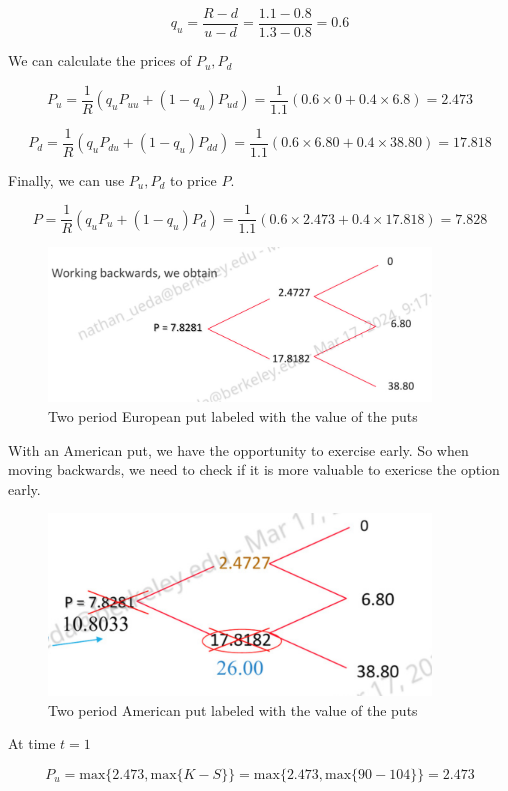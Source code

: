 \documentclass[11pt]{article}
\begin{document}
\[
q_u = \frac{R-d}{u-d}
= \frac{1.1-0.8}{1.3-0.8}
= 0.6
\]

We can calculate the prices of $P_u, P_d$

\[
P_u = \frac{1}{R}(q_u P_{uu} + (1-q_u) P_{ud})
= \frac{1}{1.1}(0.6 \times 0  + 0.4 \times 6.8)
= 2.473
\]

\[
P_d = \frac{1}{R}(q_u P_{du} + (1-q_u) P_{dd})
= \frac{1}{1.1}(0.6 \times 6.80 + 0.4 \times 38.80)    
= 17.818
\]

Finally, we can use $P_u, P_d$ to price $P$.

\[
P = \frac{1}{R}(q_u P_u + (1-q_u) P_d)
= \frac{1}{1.1}(0.6 \times 2.473 + 0.4 \times 17.818)
= 7.828
\]

\begin{figure}[H] 
    \centering 
    \includegraphics[width=4in]{imgs/two_period_euorpean_put_2.png}
    \caption{Two period European put labeled with the value of the puts} 
\end{figure}

With an American put, we have the opportunity to exercise early. 
So when moving backwards, we need to check if it is more valuable to 
exericse the option early. 

\begin{figure}[H] 
    \centering 
    \includegraphics[width=4in]{imgs/two_period_american_put.png}
    \caption{Two period American put labeled with the value of the puts} 
\end{figure}

At time $t=1$

\[
P_u = \text{max}\{2.473, \text{max}\{K - S\}\}
= \text{max}\{2.473, \text{max}\{90 - 104\}\}
= 2.473
\]
\end{document}
